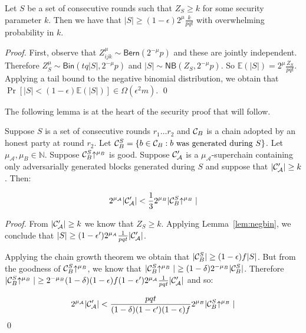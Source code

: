 \begin{lemma}\label{lem:negbin}
    Let $S$ be a set of consecutive rounds such that $Z_S \geq k$ for some
    security parameter $k$. Then we have that $|S| \geq (1 -
    \epsilon)2^\mu\frac{k}{pqt}$ with overwhelming probability in $k$.
\end{lemma}
\begin{proof}
    First, observe that $Z_{ijk}^\mu \sim \textsf{Bern}(2^{-\mu}p)$ and these are
    jointly independent. Therefore $Z_S^\mu \sim \textsf{Bin}(tq|S|, 2^{-\mu}p)$ and
    $|S| \sim \textsf{NB}(Z_S, 2^{-\mu}p)$. So $\mathbb{E}(|S|) =
    2^\mu\frac{Z_S}{pqt}$. Applying a tail bound to the negative binomial
    distribution, we obtain that $\Pr[|S| < (1 - \epsilon)\mathbb{E}(|S|)] \in
    \Omega(\epsilon^2 m)$.
    \qed
\end{proof}

The following lemma is at the heart of the security proof that will follow.

\begin{lemma}\label{lem:level-comparison}
    Suppose $S$ is a set of consecutive rounds $r_1 \ldots r_2$ and $\mathcal{C}_B$ is
    a chain adopted by an honest party at round $r_2$. Let $\mathcal{C}_B^S = \{b \in
    \mathcal{C}_B: b \textnormal{ was generated during } S\}$. Let $\mu_\mathcal{A},
    \mu_B \in \mathbb{N}$. Suppose $\mathcal{C}_B^S\negthickspace\uparrow^{\mu_B}$ is good.
    Suppose $\mathcal{C}'_\mathcal{A}$ is a $\mu_\mathcal{A}$-superchain containing
    only adversarially generated blocks generated during $S$ and suppose that
    $|\mathcal{C}'_\mathcal{A}| \geq k$.
    Then:

    \begin{equation*}
    2^{\mu_\mathcal{A}}|\mathcal{C}'_\mathcal{A}| < \frac{1}{3}2^{\mu_B}|\mathcal{C}_B^S\negthickspace\uparrow^{\mu_B}|
    \end{equation*}
\end{lemma}
\begin{proof}
    From $|\mathcal{C}'_\mathcal{A}| \geq k$ we know that $Z_S \geq k$. Applying
    Lemma~\ref{lem:negbin}, we conclude that $|S| \geq (1 -
    \epsilon')2^{\mu_A}\frac{1}{pqt}|\mathcal{C}'_\mathcal{A}|$.

    Applying the chain growth theorem \cite{backbone} we obtain that $|\mathcal{C}_B^S|
    \geq (1 - \epsilon)f|S|$. But from the goodness of $\mathcal{C}_B^S\negthickspace\uparrow^{\mu_B}$, we
    know that $|\mathcal{C}_B^S\negthickspace\uparrow^{\mu_B}| \geq (1 -
    \delta)2^{-\mu_B}|\mathcal{C}_B^S|$. Therefore $|\mathcal{C}_B^S\negthickspace\uparrow^{\mu_B}| \geq
    2^{-\mu_B}(1 - \delta)(1 - \epsilon)f(1 -
    \epsilon')2^{\mu_\mathcal{A}}\frac{1}{pqt}|\mathcal{C}'_\mathcal{A}|$ and so:

    \begin{equation*}
    2^{\mu_\mathcal{A}}|\mathcal{C}'_\mathcal{A}|
    <
    \frac{pqt}{(1 - \delta)(1 -
    \epsilon')(1 - \epsilon)f}2^{\mu_B}|\mathcal{C}_B^S\negthickspace\uparrow^{\mu_B}|
    \end{equation*}
    \qed
\end{proof}


